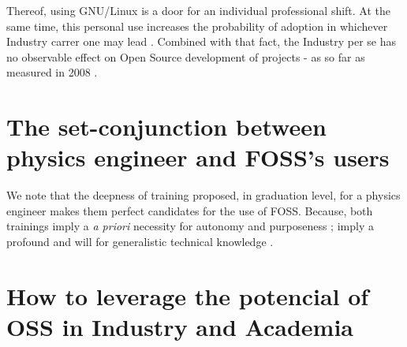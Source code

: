 \documentclass[
12pt,				%
openright,			%
oneside,			%
a4paper,			%
brazil,				%
english,			%
]{abntex2}
\begin{document}
Thereof, using GNU/Linux is a door for an individual professional shift. At the same time, this personal use increases the probability of adoption in whichever Industry carrer one may lead \cite{hauge2008adoption}. Combined with that fact, the Industry per se has no observable effect on Open Source development of projects - as so far as measured in 2008 \cite{hauge2008adoption}.



\section{The set-conjunction between physics engineer and FOSS's users}

We note that the deepness of training proposed, in graduation level, for a physics engineer makes them perfect candidates for the use of FOSS. Because, both trainings imply a \textit{a priori} necessity for autonomy and purposeness \cite{schrape2019open,racero2020predicting}; imply a profound and will for generalistic technical knowledge \cite{li2013all,gallego2015open}.

\section{How to leverage the potencial of OSS in Industry and Academia}
\end{document}
